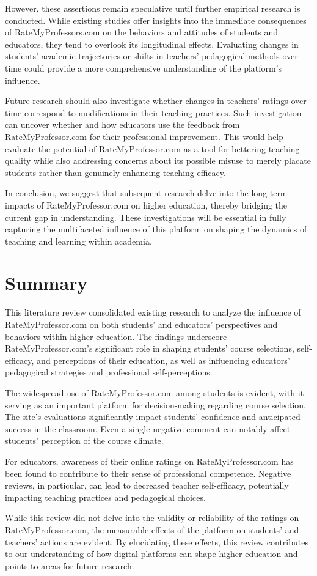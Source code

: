 \documentclass[man, 12pt]{apa7}
\begin{document}
However, these assertions remain speculative until further empirical research is conducted. While existing studies offer insights into the immediate consequences of RateMyProfessors.com on the behaviors and attitudes of students and educators, they tend to overlook its longitudinal effects. Evaluating changes in students' academic trajectories or shifts in teachers' pedagogical methods over time could provide a more comprehensive understanding of the platform's influence. 

Future research should also investigate whether changes in teachers' ratings over time correspond to modifications in their teaching practices. Such investigation can uncover whether and how educators use the feedback from RateMyProfessor.com for their professional improvement. This would help evaluate the potential of RateMyProfessor.com as a tool for bettering teaching quality while also addressing concerns about its possible misuse to merely placate students rather than genuinely enhancing teaching efficacy.

In conclusion, we suggest that subsequent research delve into the long-term impacts of RateMyProfessor.com on higher education, thereby bridging the current gap in understanding. These investigations will be essential in fully capturing the multifaceted influence of this platform on shaping the dynamics of teaching and learning within academia.

\section{Summary}
This literature review consolidated existing research to analyze the influence of RateMyProfessor.com on both students' and educators' perspectives and behaviors within higher education. The findings underscore RateMyProfessor.com's significant role in shaping students' course selections, self-efficacy, and perceptions of their education, as well as influencing educators' pedagogical strategies and professional self-perceptions.

The widespread use of RateMyProfessor.com among students is evident, with it serving as an important platform for decision-making regarding course selection. The site's evaluations significantly impact students' confidence and anticipated success in the classroom. Even a single negative comment can notably affect students' perception of the course climate.

For educators, awareness of their online ratings on RateMyProfessor.com has been found to contribute to their sense of professional competence. Negative reviews, in particular, can lead to decreased teacher self-efficacy, potentially impacting teaching practices and pedagogical choices.

While this review did not delve into the validity or reliability of the ratings on RateMyProfessor.com, the measurable effects of the platform on students' and teachers' actions are evident. By elucidating these effects, this review contributes to our understanding of how digital platforms can shape higher education and points to areas for future research.







\printbibliography
\end{document}
